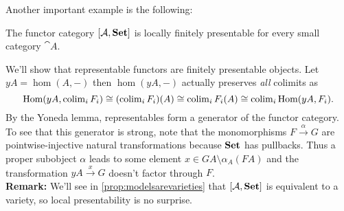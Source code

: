 Another important example is the following:
\begin{Example}\label{ex:representablepresentable}
The functor category $[\mathcal{A},\mathbf{Set}]$ is locally finitely presentable for every small category $\cat A$. 
\end{Example}
\begin{Proof}
We'll show that representable functors are finitely presentable objects. Let $yA = \hom(A,-)$ then $\hom(yA,-)$ actually preserves \emph{all} colimits as 
\[ \textrm{Hom}(yA, \operatorname{colim}_i F_i) \cong (\operatorname{colim}_i F_i)(A) \cong \operatorname{colim}_i F_i(A) \cong \operatorname{colim}_i \textrm{Hom}(yA, F_i). \]
By the Yoneda lemma, representables form a generator of the functor category. To see that this generator is strong, note that the monomorphisms $F \xrightarrow{\alpha} G$ are pointwise-injective natural transformations because $\mathbf{Set}$ has pullbacks. Thus a proper subobject $\alpha$ leads to some element $x \in GA \setminus \alpha_A(FA)$ and the transformation $yA \xrightarrow{x} G$ doesn't factor through $F$. \\

\textbf{Remark: } We'll see in \ref{prop:modelsarevarieties} that $[\mathcal{A},\mathbf{Set}]$ is equivalent to a variety, so local presentability is no surprise.
\end{Proof}

